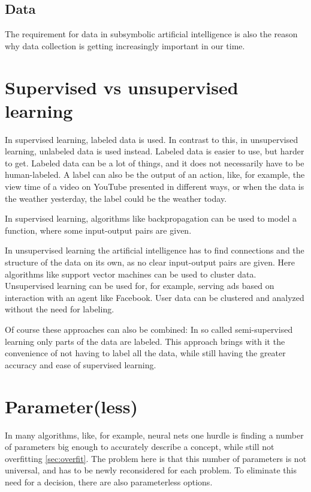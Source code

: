 \subsection{Data}
The requirement for data in subsymbolic artificial intelligence is also the reason why data collection is getting increasingly important in our time. 

\section{Supervised vs unsupervised learning} \cite[p695]{MA}
In supervised learning, labeled data is used. In contrast to this, in unsupervised learning,  unlabeled data is used instead. 
Labeled data is easier to use, but harder to get. Labeled data can be a lot of things, and it does not necessarily have to be human-labeled. A label can also be the output of an action, like, for example, the view time of a video on YouTube presented in different ways, or when the data is the weather yesterday, the label could be the weather today.

In supervised learning, algorithms like backpropagation can be used to model a function, where some input-output pairs are given.

In unsupervised learning the artificial intelligence has to find connections and the structure of the data on its own, as no clear input-output pairs are given.
Here algorithms like support vector machines can be used to cluster data. Unsupervised learning can be used for, for example, serving ads based on interaction with an agent like Facebook. User data can be clustered and analyzed without the need for labeling.

Of course these approaches can also be combined: In so called semi-supervised learning only parts of the data are labeled. This approach brings with it the convenience of not having to label all the data, while still having the greater accuracy and ease of supervised learning. \cite{semisupervised}

\section{Parameter(less)} \cite[p737]{MA}
In many algorithms, like, for example, neural nets one hurdle is finding a number of parameters big enough to accurately describe a concept, while still not  overfitting \autoref{sec:overfit}. The problem here is that this number of parameters is not universal, and has to be newly reconsidered for each problem. To eliminate this need for a decision, there are also parameterless options. 

